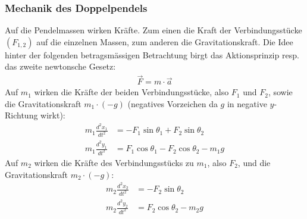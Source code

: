\documentclass[titlepage, 11pt, a4paper, ngerman]{article}
\begin{document}
\subsubsection{Mechanik des Doppelpendels}
Auf die Pendelmassen wirken Kräfte. Zum einen die Kraft der Verbindungsstücke $(F_{1, 2})$ auf die einzelnen Massen, zum anderen die Gravitationskraft. Die Idee hinter der folgenden betragsmässigen Betrachtung birgt das Aktionsprinzip resp. das zweite newtonsche Gesetz:
\begin{align*}
    \vec{F} = m \cdot \vec{a}
\end{align*}
\bigbreak
Auf $m_{1}$ wirken die Kräfte der beiden Verbindungsstücke, also $F_{1}$ und $F_{2}$, sowie die Gravitationskraft $m_{1} \cdot (-g)$ (negatives Vorzeichen da $g$ in negative $y$-Richtung wirkt):
\begin{align}
    m_{1} \frac{d^{2}x_{1}}{dt^{2}} &= -F_{1} \sin{\theta_{1}} + F_{2} \sin{\theta_{2}} \\
    m_{1} \frac{d^{2}y_{1}}{dt^{2}} &= F_{1} \cos{\theta_{1}} - F_{2} \cos{\theta_{2}} - m_{1}g
\end{align}
\bigbreak
Auf $m_{2}$ wirken die Kräfte des Verbindungsstücks zu $m_{1}$, also $F_{2}$, und die Gravitationskraft $m_{2} \cdot (-g)$:
\begin{align}
    m_{2} \frac{d^{2}x_{2}}{dt^{2}} &= -F_{2} \sin{\theta_{2}} \\
    m_{2} \frac{d^{2}y_{2}}{dt^{2}} &= F_{2} \cos{\theta_{2}} -m_{2}g
\end{align}
\end{document}
